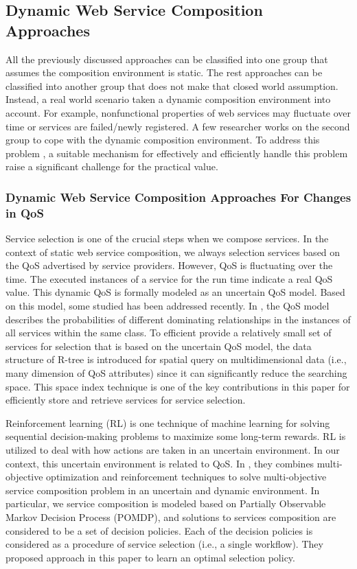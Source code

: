 \subsection{Dynamic Web Service Composition Approaches}\label{dynamicserivce}
All the previously discussed approaches can be classified into one group that assumes the composition environment is static. The rest approaches can be classified into another group that does not make that closed world assumption. Instead, a real world scenario taken a dynamic composition environment into account. For example, nonfunctional properties of web services may fluctuate over time or services are failed/newly registered. A few researcher works on the second group to cope with the dynamic composition environment. To address this problem \cite{nasridinov2012qos},  a suitable mechanism for effectively and efficiently handle this problem raise a significant challenge for the practical value.

\subsubsection{Dynamic Web Service Composition Approaches For Changes in QoS}\label{dynamicQoS}

Service selection is one of the crucial steps when we compose services. In the context of static web service composition, we always selection services based on the QoS advertised by service providers. However, QoS is fluctuating over the time. The executed instances of a service for the run time indicate a real QoS value. This dynamic QoS is formally modeled as an uncertain QoS model.  Based on this model, some studied \cite{wen2014probabilistic} has been addressed recently. In \cite{wen2014probabilistic}, the QoS model describes the probabilities of different dominating relationships in the instances of all services within the same class. To efficient provide a relatively small set of services for selection that is based on the uncertain QoS model, the data structure of R-tree is introduced for spatial query on multidimensional data (i.e., many dimension of QoS attributes) since it can significantly reduce the searching space. This space index technique is one of the key contributions in this paper for efficiently store and retrieve services for service selection. 

Reinforcement learning (RL) is one technique of machine learning for solving sequential decision-making problems to maximize some long-term rewards.  RL is utilized to deal with how actions are taken in an uncertain environment. In our context, this uncertain environment is related to QoS. In \cite{mostafa2015multi}, they combines multi-objective optimization and reinforcement techniques to solve multi-objective service composition problem in an uncertain and dynamic environment. In particular, we service composition is modeled based on Partially Observable Markov Decision Process (POMDP), and solutions to services composition are considered to be a set of decision policies. Each of the decision policies is considered as a procedure of service selection (i.e., a single workflow). They proposed approach in this paper to learn an optimal selection policy. 


